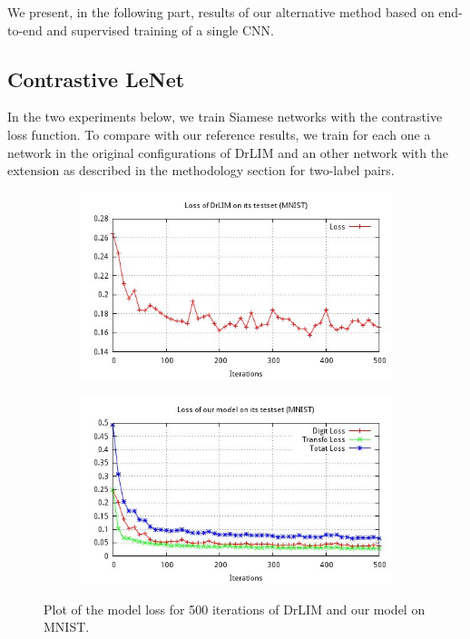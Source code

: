 \documentclass[a4paper,12pt]{report}
\begin{document}
We present, in the following part, results of our alternative method based on end-to-end and supervised training of a single CNN.

\subsection{Contrastive LeNet}

In the two experiments below, we train Siamese networks with the contrastive loss function.
To compare with our reference results, we train for each one a network in the original configurations of DrLIM and an other network with the extension as described in the methodology section for two-label pairs.

\begin{figure}[t]
    \centering
    \begin{subfigure}[t]{0.45\textwidth}
        \centering
        \includegraphics[width=\textwidth]{thesis_figures/final_loss_testset_2bv7.jpg}
    \end{subfigure}
    \begin{subfigure}[t]{0.45\textwidth}
        \centering
        \includegraphics[width=\textwidth]{thesis_figures/final_loss_testset_3Dc3.jpg}
    \end{subfigure}
    \caption{Plot of the model loss for 500 iterations of DrLIM and our model on MNIST.}
    \label{fig:mnist_cl2d_loss}
\end{figure}
\end{document}
